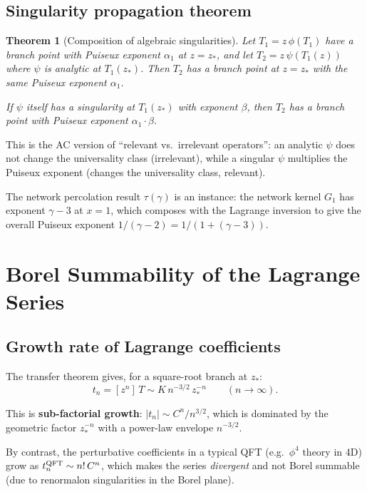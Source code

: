 \documentclass[11pt,a4paper]{article}
\newtheorem{theorem}{Theorem}[section]
\theoremstyle{definition}
\begin{document}
\subsection{Singularity propagation theorem}

\begin{theorem}[Composition of algebraic singularities]
Let $T_1 = z\,\phi(T_1)$ have a branch point with Puiseux exponent
$\alpha_1$ at $z = z_*$, and let $T_2 = z\,\psi(T_1(z))$ where $\psi$
is analytic at $T_1(z_*)$. Then $T_2$ has a branch point at $z = z_*$
with the \emph{same} Puiseux exponent $\alpha_1$.

If $\psi$ itself has a singularity at $T_1(z_*)$ with exponent $\beta$,
then $T_2$ has a branch point with Puiseux exponent $\alpha_1 \cdot \beta$.
\end{theorem}

This is the AC version of ``relevant vs.\ irrelevant operators'':
an analytic $\psi$ does not change the universality class (irrelevant),
while a singular $\psi$ multiplies the Puiseux exponent (changes the
universality class, relevant).

The network percolation result $\tau(\gamma)$ is an instance: the network
kernel $G_1$ has exponent $\gamma - 3$ at $x = 1$, which composes with
the Lagrange inversion to give the overall Puiseux exponent
$1/(\gamma - 2) = 1/(1 + (\gamma - 3))$.


\section{Borel Summability of the Lagrange Series}
\label{sec:borel}

\subsection{Growth rate of Lagrange coefficients}

The transfer theorem gives, for a square-root branch at $z_*$:
\begin{equation}
t_n = [z^n]\,T \sim K\,n^{-3/2}\,z_*^{-n}
\qquad (n \to \infty).
\end{equation}

This is \textbf{sub-factorial growth}: $|t_n| \sim C^n / n^{3/2}$,
which is dominated by the geometric factor $z_*^{-n}$ with a power-law
envelope $n^{-3/2}$.

By contrast, the perturbative coefficients in a typical QFT (e.g.\
$\phi^4$ theory in 4D) grow as $t_n^{\rm QFT} \sim n!\,C^n$, which
makes the series \emph{divergent} and not Borel summable (due to
renormalon singularities in the Borel plane).
\end{document}
